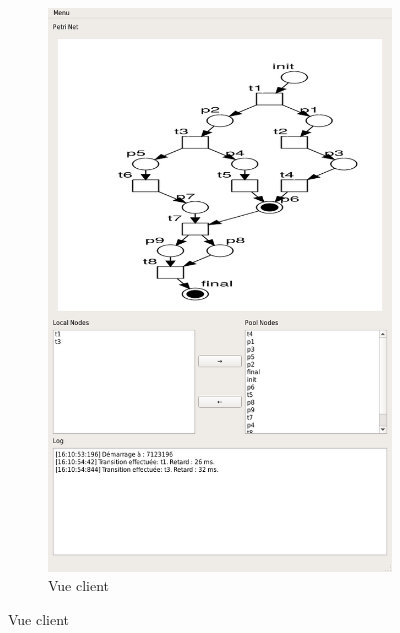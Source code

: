 \begin{figure}[H]
\begin{tabu}
\begin{subfigure}{.5\textwidth}
		\includegraphics[scale=0.3]{images/dpetriClient.png}
		\caption{Vue client}
	\end{subfigure}
	\end{tabu}
	

\end{figure}
